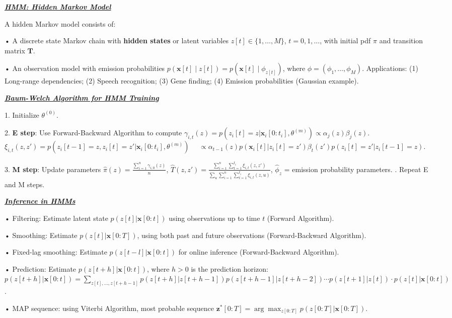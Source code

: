 \documentclass[10pt]{article}
\newcommand{\bulletPoint}[1]{\ul{\textit{\textbf{#1}}}}
\begin{document}
\begin{multicols*}{4}
\bulletPoint{HMM: Hidden Markov Model}\quad

A hidden Markov model consists of:

• A discrete state Markov chain with \textbf{hidden states} or latent variables $z[t] \in \{1, \dots, M\}$, $t = 0,1,\dots$, with initial pdf $\pi$ and transition matrix $\mathbf{T}$.

• An observation model with emission probabilities $p(\mathbf{x}[t] \mid z[t]) = p(\mathbf{x}[t] \mid \phi_{z[t]})$, where $\phi = (\phi_1, \dots, \phi_M)$. 
Applications: 
(1) Long-range dependencies; 
(2) Speech recognition;
(3) Gene finding;
(4) Emission probabilities (Gaussian example). 

\bulletPoint{Baum-Welch Algorithm for HMM Training}\quad

1. Initialize $\theta^{(0)}$.

2. \textbf{E step}: Use Forward-Backward Algorithm to compute
    $\gamma_{i,t}(z) = p(z_i[t] = z | \mathbf{x}_i[0:t_i], \theta^{(m)}) \propto \alpha_j(z) \beta_j(z)$. 
    $\xi_{i,t}(z,z') = p(z_i[t-1] = z, z_i[t] = z' | \mathbf{x}_i[0:t_i], \theta^{(m)})$
    $\quad \propto \alpha_{t-1}(z) p(\mathbf{x}_i[t] | z_i[t]=z') \beta_t(z') p(z_i[t] = z' | z_i[t-1] = z)$. 

3. \textbf{M step}: Update parameters
    $\hat{\pi}(z) = \frac{\sum_{i=1}^{n} \gamma_{i,0}(z)}{n}$, 
    $\hat{T}(z,z') = \frac{\sum_{i=1}^{n} \sum_{t=1}^{t_i} \xi_{i,t}(z,z')}{\sum_u \sum_{i=1}^{n} \sum_{t=1}^{t_i} \xi_{i,t}(z,u)}$, 
    $\hat{\phi}_z$ = emission probability parameters. . Repeat E and M steps.
  
\bulletPoint{Inference in HMMs}\quad

• Filtering: Estimate latent state $p(z[t] | \mathbf{x}[0:t])$ using observations up to time $t$ ({Forward Algorithm}). 

• Smoothing: Estimate $p(z[t] | \mathbf{x}[0:T])$, using both past and future observations ({Forward-Backward Algorithm}). 

• Fixed-lag smoothing: Estimate $p(z[t-l] | \mathbf{x}[0:t])$ for online inference ({Forward-Backward Algorithm}). 

• Prediction: Estimate $p(z[t+h] | \mathbf{x}[0:t])$, where $h > 0$ is the prediction horizon:
$p(z[t+h] | \mathbf{x}[0:t]) = \sum_{z[t],...,z[t+h-1]} p(z[t+h] | z[t+h-1]) p(z[t+h-1] | z[t+h-2]) \cdots p(z[t+1] | z[t]) \cdot p(z[t] | \mathbf{x}[0:t])$. 

• MAP sequence: using Viterbi Algorithm, most probable sequence $\mathbf{z}^*[0:T] = \arg\max_{z[0:T]} p(z[0:T] | \mathbf{x}[0:T])$.



\end{multicols*}
\end{document}
